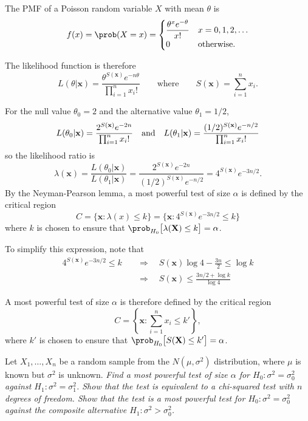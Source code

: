 \begin{solution}
The PMF of a Poisson random variable $X$ with mean $\theta$ is 
\[
f(x) = \prob(X=x) = \begin{cases}
\displaystyle\frac{\theta^{x} e^{-\theta}}{x!}		& x=0,1,2,\ldots \\
0														& \text{otherwise.}
\end{cases}
\]

The likelihood function is therefore
\[
L(\theta|\mathbf{x}) = \frac{\theta^{S(\mathbf{x})} e^{-n\theta}}{\prod_{i=1}^n x_i!}
\qquad\text{where}\qquad
S(\mathbf{x}) = \sum_{i=1}^n x_i.
\]

For the null value $\theta_0=2$ and the alternative value $\theta_1=1/2$, 
\[
L(\theta_0|\mathbf{x}) = \frac{2^{S(\mathbf{x})} e^{-2n}}{\prod_{i=1}^n x_i!} 
\text{\quad and\quad}
L(\theta_1|\mathbf{x}) = \frac{(1/2)^{S(\mathbf{x})} e^{-n/2}}{\prod_{i=1}^n x_i!} 
\]
so the likelihood ratio is
\[
\lambda(\mathbf{x})
	= \frac{L(\theta_0|\mathbf{x})}{L(\theta_1|\mathbf{x})} 
	= \frac{2^{S(\mathbf{x})} e^{-2n}}{(1/2)^{S(\mathbf{x})} e^{-n/2}}
	= 4^{S(\mathbf{x})} e^{-3n/2}.
\]
By the Neyman-Pearson lemma, a most powerful test of size $\alpha$ is defined by the critical region
\[
C = \{\mathbf{x}:\lambda(x)\leq k\} = \{\mathbf{x}:4^{S(\mathbf{x})} e^{-3n/2}\leq k\}
\]
where $k$ is chosen to ensure that $\prob_{H_0}\big[\lambda(\mathbf{X})\leq k\big]=\alpha$.

\vspace*{2ex}
To simplify this expression, note that
\begin{align*}
4^{S(\mathbf{x})} e^{-3n/2}\leq k
	& \quad \Rightarrow\quad 
		S(\mathbf{x})\log 4 - \frac{3n}{2} \leq \log k \\
	& \quad \Rightarrow\quad 
		S(\mathbf{x}) \leq \frac{3n/2 + \log k}{\log 4}
\end{align*}

A most powerful test of size $\alpha$ is therefore defined by the critical region
\[
C = \left\{\mathbf{x}:\sum_{i=1}^n x_i \leq k'\right\},
\]
where $k'$ is chosen to ensure that $\prob_{H_0}\big[S(\mathbf{X})\leq k'\big] = \alpha$.
\end{solution}


\begin{example}
Let $X_1,\ldots,X_n$ be a random sample from the $N(\mu,\sigma^2)$ distribution, where $\mu$ is known but $\sigma^2$ is unknown.
\ben
\it Find a most powerful test of size $\alpha$ for $H_0:\sigma^2=\sigma_0^2$ against $H_1:\sigma^2=\sigma_1^2$.
\it Show that the test is equivalent to a chi-squared test with $n$ degrees of freedom.
\it Show that the test is a most powerful test for $H_0:\sigma^2=\sigma_0^2$ against the composite alternative $H_1:\sigma^2 > \sigma_0^2$.
\een
\end{example}

